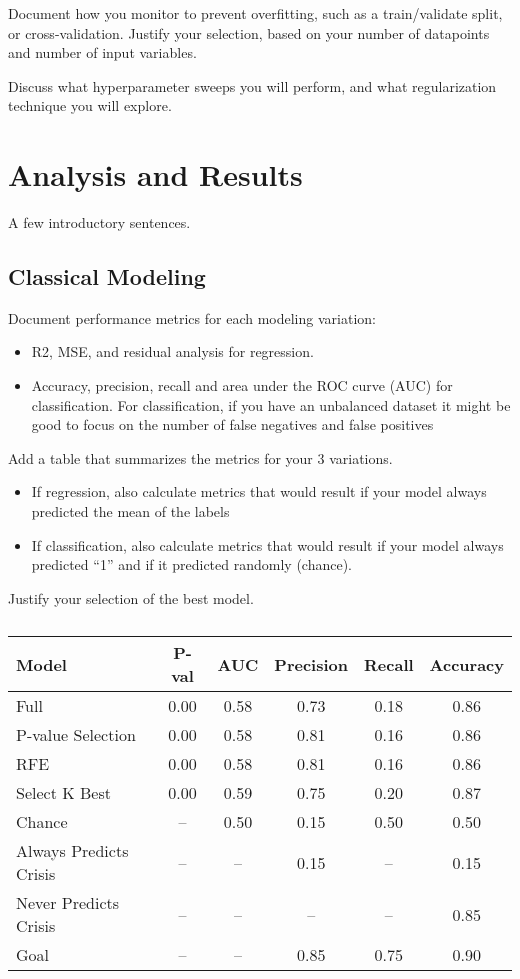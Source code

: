 \documentclass[letterpaper,conference]{IEEEtran}
\begin{document}
{Document how you monitor to prevent overfitting, such as a train/validate split, or cross-validation. Justify your selection, based on your number of datapoints and number of input variables.

Discuss what hyperparameter sweeps you will perform, and what regularization technique you will explore. 

\section{Analysis and Results}
A few introductory sentences.

\subsection{Classical Modeling}
Document performance metrics for each modeling variation: 
\begin{itemize}
\item R2, MSE, and residual analysis for regression.
\item Accuracy, precision, recall and area under the ROC curve (AUC) for classification.  For classification, if you have an unbalanced dataset it might be good to focus on the number of false negatives and false positives
\end{itemize}
Add a table that summarizes the metrics for your 3 variations. 
\begin{itemize}
\item If regression, also calculate metrics that would result if your model always predicted the mean of the labels
\item If classification, also calculate metrics that would result if your model always predicted ``1'' and if it predicted randomly (chance).
\end{itemize}
Justify your selection of the best model.

\begin{table}[!h]
\begin{center}
\caption{\color{RoyalBlue3}{(example) Logistic Regression Model Results. (note to class: the P-value selection, RGE and Select K Best are just examples – you can choose the modeling variations that you try)}}
\label{tab2}
\begin{tabular}{ l  c c c c c }
\hline
Model & P-val & AUC & Precision & Recall & Accuracy \\
\hline
Full	                  & 0.00	& 0.58 &0.73	& 0.18	& 0.86 \\
P-value Selection	& 0.00	& 0.58	& 0.81	& 0.16	& 0.86 \\
RFE	                  & 0.00	& 0.58	& 0.81	& 0.16	& 0.86 \\
Select K Best	         & 0.00	& 0.59	& 0.75	& 0.20	& 0.87 \\
Chance	             &  --	& 0.50	& 0.15	& 0.50	& 0.50 \\
Always Predicts Crisis&	--	& --    &0.15 &	--	& 0.15 \\
Never Predicts Crisis&	-- 	&-- 	&-- 	&--     & 0.85\\
Goal	                 &--      &--	    & 0.85	& 0.75 & 0.90\\
\hline 



\end{tabular}
\end{center}
\end{table}}
\end{document}
